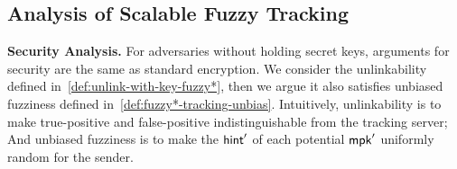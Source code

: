 \subsection{Analysis of Scalable Fuzzy Tracking }\label{sec:security_scalable_fuzzy}



\smallskip\noindent\textbf{Security Analysis.}
For adversaries without holding secret keys, arguments for security are the same as standard encryption.
We consider the unlinkability defined in~\cref{def:unlink-with-key-fuzzy*}, then we argue it also satisfies unbiased fuzziness defined in~\cref{def:fuzzy*-tracking-unbias}. Intuitively, unlinkability is to make true-positive and false-positive indistinguishable from the tracking server; And unbiased fuzziness is to make the $\mathsf{hint}'$ of each potential $\mathsf{mpk}'$ uniformly random for the sender. 

